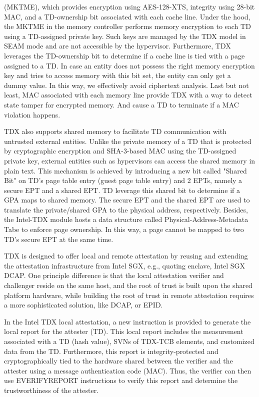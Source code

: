 (MKTME), which provides encryption using AES-128-XTS, integrity using 28-bit MAC, and a TD-ownership bit associated with each cache line\cite*{Intel_tdx_whitepaper}. Under the hood, the 
MKTME in the memory controller performs memory encryption to each TD using a TD-assigned private key. Such keys are managed by the TDX model in SEAM mode and are 
not accessible by the hypervisor. Furthermore, TDX leverages the TD-ownership bit to determine if a cache line is tied with a page assigned to a TD. In case an 
entity does not possess the right memory encryption key and tries to access memory with this bit set, the entity can only get a dummy value\cite*{Intel_tdx_whitepaper}. In this way, we 
effectively avoid ciphertext analysis. Last but not least, MAC associated with each memory line provide  TDX with a way to detect state tamper for encrypted memory.   
And cause a TD to terminate if a MAC violation happens.

TDX also supports shared memory to facilitate TD communication with untrusted external entities. Unlike the private memory of a TD that is protected by cryptographic encryption and SHA-3-based MAC 
using the TD-assigned private key, external entities such as hypervisors can access the shared memory in plain text. This mechanism is achieved by introducing a new bit called "Shared Bit" 
on TD's page table entry (guest page table entry) and  2 EPTs, namely a secure EPT and a shared EPT. TD leverage this shared bit to determine if a GPA maps to shared memory. The secure EPT and 
the shared EPT are used to translate the private/shared GPA to the physical address, respectively. Besides, the Intel-TDX module hosts a data structure called Physical-Address-Metadata Tabe to 
enforce page ownership. In this way, a page cannot be mapped to two TD's secure EPT at the same time.

TDX is designed to offer local and remote attestation by reusing and extending the attestation infrastructure from Intel SGX\cite*{Intel_tdx_whitepaper}, e.g., quoting enclave, Intel SGX DCAP. One principle difference is 
that the local attestation verifier and challenger reside on the same host, and the root of trust is built upon the shared platform hardware, while building the root of trust in remote attestation 
requires a more sophisticated solution, like DCAP\cite*{Intel_DCAP}, or EPID\cite*{Intel_EPID}.   

In the Intel TDX local attestation, a new instruction is provided to generate the local report for the attester (TD). This local report includes the measurement associated with a TD (hash value), 
SVNs of TDX-TCB elements, and customized data from the TD\cite*{Intel_tdx_whitepaper}. Furthermore, this report is integrity-protected and cryptographically tied to the hardware shared between the verifier and the attester 
using a message authentication code (MAC). Thus, the verifier can then use EVERIFYREPORT instructions to verify this report and determine the trustworthiness of the attester. 

